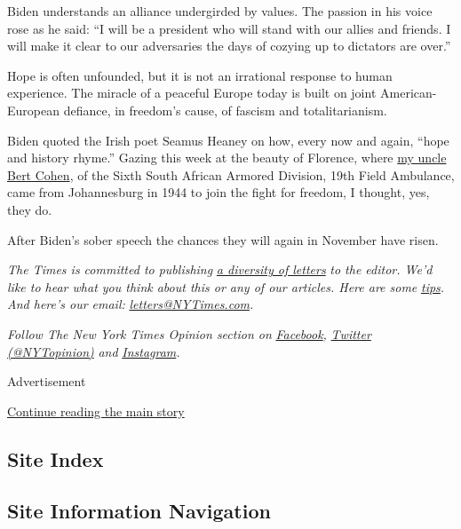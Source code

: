 Biden understands an alliance undergirded by values. The passion in his
voice rose as he said: ``I will be a president who will stand with our
allies and friends. I will make it clear to our adversaries the days of
cozying up to dictators are over.''

Hope is often unfounded, but it is not an irrational response to human
experience. The miracle of a peaceful Europe today is built on joint
American-European defiance, in freedom's cause, of fascism and
totalitarianism.

Biden quoted the Irish poet Seamus Heaney on how, every now and again,
``hope and history rhyme.'' Gazing this week at the beauty of Florence,
where
\href{https://www.nytimes3xbfgragh.onion/2014/04/08/opinion/cohen-from-death-into-life.html}{my
uncle Bert Cohen}, of the Sixth South African Armored Division, 19th
Field Ambulance, came from Johannesburg in 1944 to join the fight for
freedom, I thought, yes, they do.

After Biden's sober speech the chances they will again in November have
risen.

\emph{The Times is committed to publishing}
\href{https://www.nytimes3xbfgragh.onion/2019/01/31/opinion/letters/letters-to-editor-new-york-times-women.html}{\emph{a
diversity of letters}} \emph{to the editor. We'd like to hear what you
think about this or any of our articles. Here are some}
\href{https://help.nytimes3xbfgragh.onion/hc/en-us/articles/115014925288-How-to-submit-a-letter-to-the-editor}{\emph{tips}}\emph{.
And here's our email:}
\href{mailto:letters@NYTimes.com}{\emph{letters@NYTimes.com}}\emph{.}

\emph{Follow The New York Times Opinion section on}
\href{https://www.facebookcorewwwi.onion/nytopinion}{\emph{Facebook}}\emph{,}
\href{http://twitter.com/NYTOpinion}{\emph{Twitter (@NYTopinion)}}
\emph{and}
\href{https://www.instagram.com/nytopinion/}{\emph{Instagram}}\emph{.}

Advertisement

\protect\hyperlink{after-bottom}{Continue reading the main story}

\hypertarget{site-index}{%
\subsection{Site Index}\label{site-index}}

\hypertarget{site-information-navigation}{%
\subsection{Site Information
Navigation}\label{site-information-navigation}}

